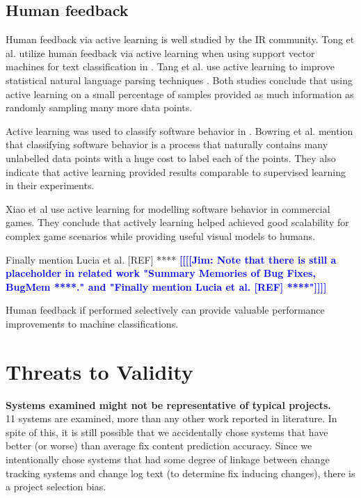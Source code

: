 \documentclass[10pt, conference, letterpaper, compsocconf]{IEEEtran}
\newcommand{\todoc}[2]{{\textcolor{#1} {\textbf{[[#2]]}}}}
\newcommand{\todoblue}[1]{\todoc{blue}{\textbf{[[#1]]}}}
\newcommand{\jim}[1]{\todoblue{Jim: #1}}
\begin{document}
\subsection{Human feedback}
Human feedback via active learning is well studied by the IR community. Tong et al. utilize human feedback via active learning when using support vector machines for text classification in \cite{tong2002support}. Tang et al. use active learning to improve statistical natural language parsing techniques \cite{tang2002active}. Both studies conclude that using active learning on a small percentage of samples provided as much information as randomly sampling many more data points. 

Active learning was used to classify software behavior in \cite{bowring2004ala}. Bowring et al. \cite{bowring2004ala} mention that classifying software behavior is a process that naturally contains many unlabelled data points with a huge cost to label each of the points. They also indicate that active learning provided results comparable to supervised learning in their experiments.
 
Xiao et al \cite{xiao2005sta} use active learning for modelling software behavior in commercial games. They conclude that actively learning helped achieved good scalability for complex game scenarios while providing useful visual models to humans.

Finally mention Lucia et al. [REF] ****
\jim{Note that there is still a placeholder in related work "Summary Memories of Bug Fixes, BugMem ****." and "Finally mention Lucia et al. [REF] ****"}

Human feedback if performed selectively can provide valuable performance improvements to machine classifications.


\section{Threats to Validity}
\label{ThreatsToValidity}

\par \textbf{Systems examined might not be representative of typical projects.} \\
11 systems are examined, more than any
other work reported in literature. In spite of this, it is still possible that we accidentally chose
systems that have better (or worse) than average fix content prediction accuracy. Since we
intentionally chose systems that had some degree of linkage between change tracking
systems and change log text (to determine fix inducing changes), there is a
project selection bias.
\end{document}
